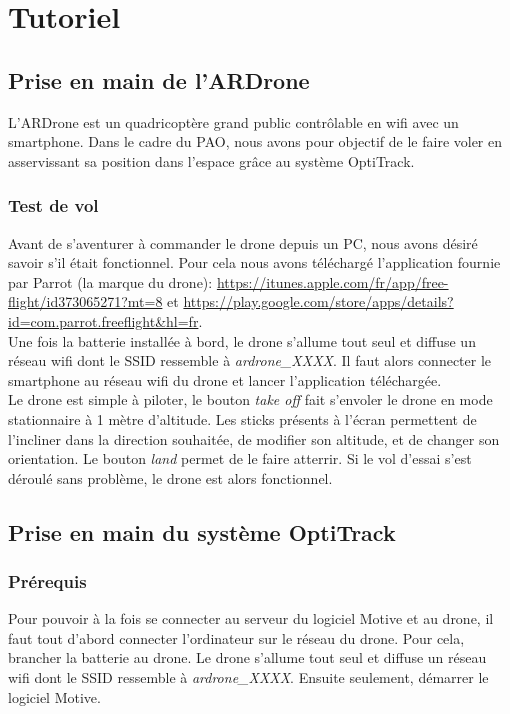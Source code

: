\chapter{Tutoriel}
    \section{Prise en main de l'ARDrone}
        L'ARDrone est un quadricoptère grand public contrôlable en wifi avec un smartphone. Dans le cadre du PAO, nous avons pour objectif de le faire voler en asservissant sa position dans l'espace grâce au système OptiTrack.

        \subsection{Test de vol}
            Avant de s'aventurer à commander le drone depuis un PC, nous avons désiré savoir s'il était fonctionnel. Pour cela nous avons téléchargé l'application fournie par Parrot (la marque du drone): \url{https://itunes.apple.com/fr/app/free-flight/id373065271?mt=8} et \url{https://play.google.com/store/apps/details?id=com.parrot.freeflight&hl=fr}. \\

            Une fois la batterie installée à bord, le drone s'allume tout seul et diffuse un réseau wifi dont le SSID ressemble à \textit{ardrone\_XXXX}. Il faut alors connecter le smartphone au réseau wifi du drone et lancer l'application téléchargée. \\

            Le drone est simple à piloter, le bouton \textit{take off} fait s'envoler le drone en mode stationnaire à 1 mètre d'altitude. Les sticks présents à l'écran permettent de l'incliner dans la direction souhaitée, de modifier son altitude, et de changer son orientation. Le bouton \textit{land} permet de le faire atterrir. Si le vol d'essai s'est déroulé sans problème, le drone est alors fonctionnel.


    \section{Prise en main du système OptiTrack}
        \subsection{Prérequis}
            Pour pouvoir à la fois se connecter au serveur du logiciel Motive et au drone, il faut tout d'abord connecter l'ordinateur sur le réseau du drone. Pour cela, brancher la batterie au drone. Le drone s'allume tout seul et diffuse un réseau wifi dont le SSID ressemble à \textit{ardrone\_XXXX}. Ensuite seulement, démarrer le logiciel Motive.

